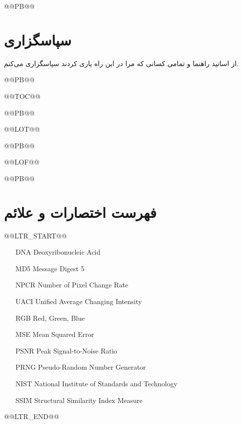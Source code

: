 @@PB@@

    
\chapter*{سپاسگزاری}
از اساتید راهنما و تمامی کسانی که مرا در این راه یاری کردند سپاسگزاری می‌کنم.


@@PB@@

 



\begin{NoHyper}


@@TOC@@




@@PB@@




@@LOT@@




@@PB@@




@@LOF@@


\end{NoHyper}


@@PB@@

   
\chapter*{فهرست اختصارات و علائم}

@@LTR_START@@

\begin{itemize}
    \item[DNA] Deoxyribonucleic Acid
    \item[MD5] Message Digest 5
    \item[NPCR] Number of Pixel Change Rate
    \item[UACI] Unified Average Changing Intensity
    \item[RGB] Red, Green, Blue
    \item[MSE] Mean Squared Error
    \item[PSNR] Peak Signal-to-Noise Ratio
    \item[PRNG] Pseudo-Random Number Generator
    \item[NIST] National Institute of Standards and Technology
    \item[SSIM] Structural Similarity Index Measure
\end{itemize}

@@LTR_END@@

